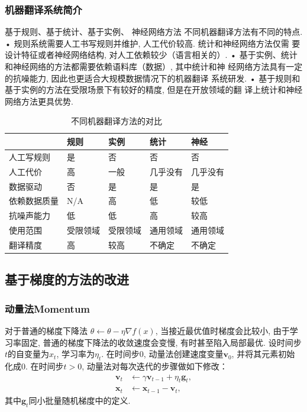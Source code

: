 \documentclass[a4paper]{article}
\theoremstyle{definition}
\numberwithin{equation}{section}
\begin{document}
\subsubsection{机器翻译系统简介}
\citep{xiao2020}

基于规则、基于统计、基于实例、 神经网络方法
不同机器翻译方法有不同的特点.  
• 规则系统需要人工书写规则并维护, 人工代价较高. 统计和神经网络方法仅需
要设计特征或者神经网络结构, 对人工依赖较少（语言相关的）. 
• 基于实例、统计和神经网络的方法都需要依赖语料库（数据）, 其中统计和神
经网络方法具有一定的抗噪能力, 因此也更适合大规模数据情况下的机器翻译
系统研发. 
• 基于规则和基于实例的方法在受限场景下有较好的精度, 但是在开放领域的翻
译上统计和神经网络方法更具优势. 
\begin{table}  [!htb]
    \Large  
    \caption{不同机器翻译方法的对比}  
    \begin{center}  
    \begin{tabular}{l|lll l}  
    \hline  
    &规则&实例&统计&神经 \\ \hline
    人工写规则&是&否&否&否\\ 
    人工代价&高&一般&几乎没有&几乎没有\\ 
    数据驱动&否&是&是&是\\ 
    依赖数据质量&N/A&高&低&较低\\ 
    抗噪声能力&低&低&高&较高\\ 
    使用范围&受限领域&受限领域&通用领域&通用领域\\ 
    翻译精度&高&较高&不确定&不确定\\  
    \hline  
    \end{tabular}  
    \end{center}  
    \end{table}

\subsection{基于梯度的方法的改进}
 \subsubsection{动量法Momentum}
 对于普通的梯度下降法 $\theta \leftarrow \theta - \eta \nabla f(x)$,  当接近最优值时梯度会比较小, 由于学习率固定, 普通的梯度下降法的收敛速度会变慢, 有时甚至陷入局部最优.   
设时间步$t$的自变量为${x}_t$, 学习率为$\eta_t$. 
在时间步$0$, 动量法创建速度变量$\boldsymbol{v}_0$, 并将其元素初始化成0. 在时间步$t>0$, 动量法对每次迭代的步骤做如下修改：
 $$
 \begin{aligned}
 \boldsymbol{v}_t &\leftarrow \gamma \boldsymbol{v}_{t-1} + \eta_t \boldsymbol{g}_t,  \\
 \boldsymbol{x}_t &\leftarrow \boldsymbol{x}_{t-1} - \boldsymbol{v}_t, 
 \end{aligned}
 $$
 其中$\boldsymbol{g}_t$同小批量随机梯度中的定义.
\end{document}

